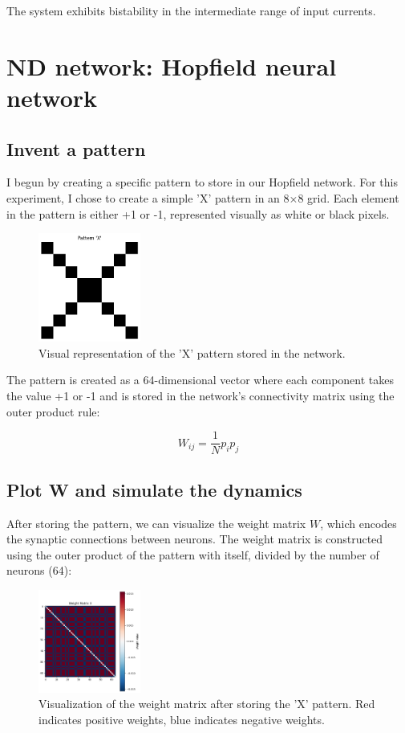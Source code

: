\documentclass{article}
\begin{document}
The system exhibits bistability in the intermediate range of input currents. 




\section{ND network: Hopfield neural network}


\subsection{Invent a pattern}

I begun by creating a specific pattern to store in our Hopfield network. For this experiment, I chose to create a simple 'X' pattern in an 8×8 grid. Each element in the pattern is either +1 or -1, represented visually as white or black pixels.

\begin{figure}[H]
\centering
\includegraphics[width=0.3\textwidth]{Pattern 'X'.png}
\caption{Visual representation of the 'X' pattern stored in the network.}
\label{fig:pattern}
\end{figure}

The pattern is created as a 64-dimensional vector where each component takes the value +1 or -1 and is stored in the network's connectivity matrix using the outer product rule:

\begin{equation}
W_{ij} = \frac{1}{N}p_i p_j
\end{equation}

\subsection{Plot W and simulate the dynamics}
After storing the pattern, we can visualize the weight matrix $W$, which encodes the synaptic connections between neurons. The weight matrix is constructed using the outer product of the pattern with itself, divided by the number of neurons (64):

\begin{figure}[H]
\centering
\includegraphics[width=0.3\textwidth]{Weight Matrix X.png}
\caption{Visualization of the weight matrix after storing the 'X' pattern. Red indicates positive weights, blue indicates negative weights.}
\label{fig:weight_matrix}
\end{figure}
\end{document}
